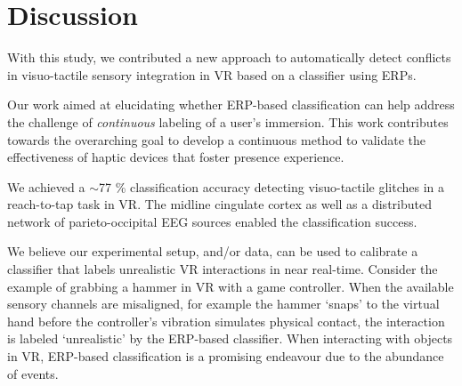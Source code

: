 \section{Discussion}

With this study, we contributed a new approach to automatically detect conflicts in visuo-tactile sensory integration in VR based on a classifier using ERPs. 

Our work aimed at elucidating whether ERP-based classification can help address the challenge of \textit{continuous} labeling of a user's immersion. This work contributes towards the overarching goal to develop a continuous method to validate the effectiveness of haptic devices that foster presence experience.

We achieved a $\sim$77 \% classification accuracy detecting visuo-tactile glitches in a reach-to-tap task in VR. The midline cingulate cortex as well as a distributed network of parieto-occipital EEG sources enabled the classification success.

We believe our experimental setup, and/or data, can be used to calibrate a classifier that labels unrealistic VR interactions in near real-time. Consider the example of grabbing a hammer in VR with a game controller. When the available sensory channels are misaligned, for example the hammer `snaps' to the virtual hand before the controller's vibration simulates physical contact, the interaction is labeled `unrealistic' by the ERP-based classifier. When interacting with objects in VR, ERP-based classification is a promising endeavour due to the abundance of events.


